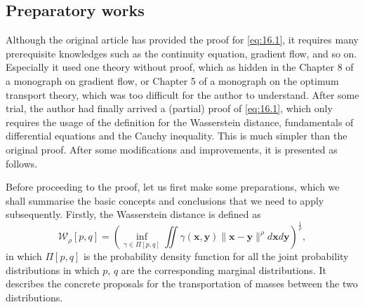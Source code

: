 \subsection{Preparatory works}

Although the original article has provided the proof for \cref{eq:16.1}, it requires many prerequisite knowledges such as the continuity equation, gradient flow, and so on. Especially it used one theory without proof, which as hidden in the Chapter 8 of a monograph on  gradient flow, or Chapter 5 of a monograph on the optimum transport theory, which was too difficult for the author to  understand. After some trial, the author had finally arrived a (partial) proof of \cref{eq:16.1}, which only requires the usage of the definition for the Wasserstein distance, fundamentals of differential equations and the Cauchy inequality. This is much simpler than the original proof. After some modifications and improvements, it is presented as follows.

Before proceeding to the proof, let us first make some preparations, which we shall summarise the basic concepts and conclusions that we need to apply subsequently. Firstly,  the Wasserstein distance is defined as 
\begin{equation}
    \label{eq:16.7}
    \mathcal{W}_{\rho}[p,q]=\left( \inf_{\gamma\in\Pi[p,q]}\iint\gamma(\bm{x},\bm{y})\|\bm{x}-\bm{y}\|^\rho d\bm{x}d\bm{y}\right)^{\frac{1}{\rho}},
\end{equation}
in which $\Pi[p,q]$ is the probability density function for all the joint probability distributions in which $p$, $q$ are the corresponding marginal distributions. It describes the concrete proposals for the transportation of masses between the two distributions. 

